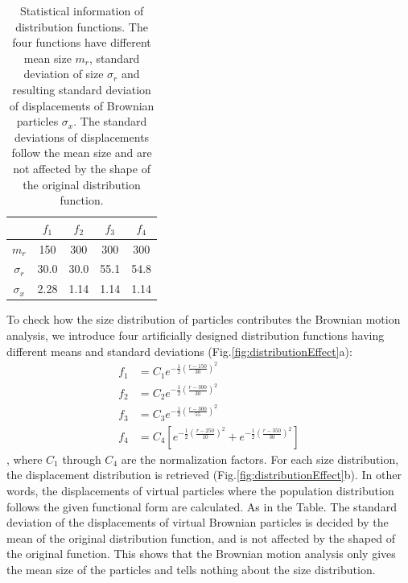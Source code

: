 \begin{table}[h!]
\footnotesize
\centering
\begin{tabular}{c|cccc}
                    & $f_1$   & $f_2$   & $f_3$  & $f_4$   \\ \hline
$m_r$          & 150     & 300    & 300    & 300 \\
$\sigma_r$   & 30.0    & 30.0    & 55.1    & 54.8 \\
$\sigma_x$  & 2.28    & 1.14    & 1.14    & 1.14
\end{tabular}
\caption{Statistical information of distribution functions. The four functions have different mean size $m_r$, standard deviation of size $\sigma_r$ and resulting standard deviation of displacements of Brownian particles $\sigma_x$. The standard deviations of displacements follow the mean size and are not affected by the shape of the original distribution function.}
\label{table:standardDeviation}
\end{table}

To check how the size distribution of particles contributes the Brownian motion analysis, we introduce four artificially designed distribution functions having different means and standard deviations (Fig.\ref{fig:distributionEffect}a):
\begingroup
\allowdisplaybreaks
\begin{align}
f_1 &= C_1 e^{ - \frac{1}{2} \left( \frac{r - 150}{30} \right)^2 } \\
f_2 &= C_2 e^{ - \frac{1}{2} \left( \frac{r - 300}{30} \right)^2 } \\
f_3 &= C_3 e^{ - \frac{1}{2} \left( \frac{r - 300}{55} \right)^2 } \\
f_4 &= C_4 \left[ e^{ - \frac{1}{2} \left( \frac{r - 250}{10} \right)^2 } + e^{ - \frac{1}{2} \left( \frac{r - 350}{30} \right)^2 } \right]
\end{align}
\endgroup
, where $C_1$ through $C_4$ are the normalization factors. For each size distribution, the displacement distribution is retrieved (Fig.\ref{fig:distributionEffect}b). In other words, the displacements of virtual particles where the population distribution follows the given functional form are calculated. As in the Table. The standard deviation of the displacements of virtual Brownian particles is decided by the mean of the original distribution function, and is not affected by the shaped of the original function. This shows that the Brownian motion analysis only gives the mean size of the particles and tells nothing about the size distribution.



